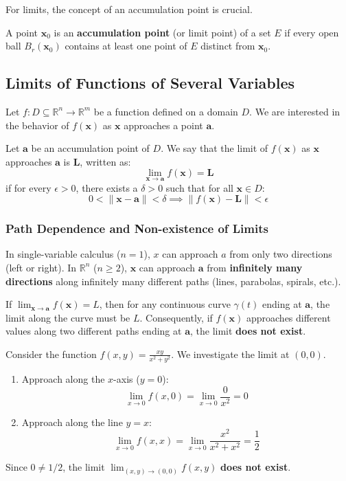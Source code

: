 \documentclass[oneside]{book}
\begin{document}
For limits, the concept of an accumulation point is crucial.

\begin{definition}
A point $\mathbf{x}_0$ is an \textbf{accumulation point} (or limit point) of a set $E$ if every open ball $B_r(\mathbf{x}_0)$ contains at least one point of $E$ distinct from $\mathbf{x}_0$.
\end{definition}

\subsection{Limits of Functions of Several Variables}

Let $f: D \subseteq \mathbb{R}^n \to \mathbb{R}^m$ be a function defined on a domain $D$. We are interested in the behavior of $f(\mathbf{x})$ as $\mathbf{x}$ approaches a point $\mathbf{a}$.

\begin{definition}[Limit]
Let $\mathbf{a}$ be an accumulation point of $D$. We say that the limit of $f(\mathbf{x})$ as $\mathbf{x}$ approaches $\mathbf{a}$ is $\mathbf{L}$, written as:
\[ \lim_{\mathbf{x} \to \mathbf{a}} f(\mathbf{x}) = \mathbf{L} \]
if for every $\epsilon > 0$, there exists a $\delta > 0$ such that for all $\mathbf{x} \in D$:
\[ 0 < \|\mathbf{x} - \mathbf{a}\| < \delta \implies \|f(\mathbf{x}) - \mathbf{L}\| < \epsilon \]
\end{definition}

\subsubsection{Path Dependence and Non-existence of Limits}

In single-variable calculus ($n=1$), $x$ can approach $a$ from only two directions (left or right). In $\mathbb{R}^n$ ($n \ge 2$), $\mathbf{x}$ can approach $\mathbf{a}$ from \textbf{infinitely many directions} along infinitely many different paths (lines, parabolas, spirals, etc.).

\begin{theorem}
If $\lim_{\mathbf{x} \to \mathbf{a}} f(\mathbf{x}) = L$, then for any continuous curve $\gamma(t)$ ending at $\mathbf{a}$, the limit along the curve must be $L$.
Consequently, if $f(\mathbf{x})$ approaches different values along two different paths ending at $\mathbf{a}$, the limit \textbf{does not exist}.
\end{theorem}

\begin{example}
Consider the function $f(x, y) = \frac{xy}{x^2 + y^2}$. We investigate the limit at $(0,0)$.
\begin{enumerate}
    \item Approach along the $x$-axis ($y=0$):
    \[ \lim_{x \to 0} f(x, 0) = \lim_{x \to 0} \frac{0}{x^2} = 0 \]
    \item Approach along the line $y=x$:
    \[ \lim_{x \to 0} f(x, x) = \lim_{x \to 0} \frac{x^2}{x^2 + x^2} = \frac{1}{2} \]
\end{enumerate}
Since $0 \ne 1/2$, the limit $\lim_{(x,y) \to (0,0)} f(x,y)$ \textbf{does not exist}.
\end{example}
\end{document}
